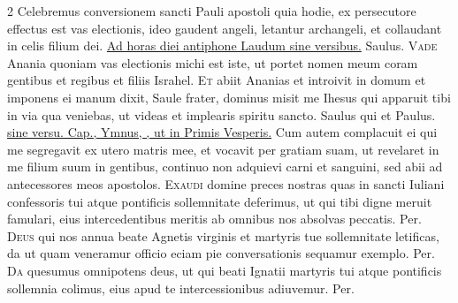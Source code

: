 \begin{multicols*}{2}
 Celebremus conversionem sancti Pauli apostoli quia hodie, ex persecutore effectus est vas electionis, ideo gaudent angeli, letantur archangeli, et collaudant in celis filium dei.
\newline \ul{Ad horas diei antiphone Laudum sine versibus.}
 Saulus.
\lettrine[lines=2]{\zallmancaps \color{Blue} V}{ade} Anania quoniam vas electionis michi est iste, ut portet nomen meum coram gentibus et regibus et filiis Israhel.
\lettrine[lines=2]{\zallmancaps \color{Red} E}{t} abiit Ananias et introivit in domum et imponens ei manum dixit, Saule frater, dominus misit me Ihesus qui apparuit tibi in via qua veniebas, ut videas et implearis spiritu sancto.
 Saulus qui et Paulus. \ul{sine versu. Cap., Ymnus, \Vbar , ut in Primis Vesperis.}
 Cum autem complacuit ei qui me segregavit ex utero matris mee, et vocavit per gratiam suam, ut revelaret in me filium suum in gentibus, continuo non adquievi carni et sanguini, sed abii ad antecessores meos apostolos.
{\color{Red} }
\lettrine[lines=2]{\zallmancaps \color{Blue} E}{xaudi} domine preces nostras quas in sancti Iuliani confessoris tui atque pontificis sollemnitate deferimus, ut qui tibi digne meruit famulari, eius intercedentibus meritis ab omnibus nos absolvas peccatis. Per.
{\color{Red} }
\lettrine[lines=2]{\zallmancaps \color{Red} D}{eus} qui nos annua beate Agnetis virginis et martyris tue sollemnitate letificas, da ut quam veneramur officio eciam pie conversationis sequamur exemplo. Per.
{\color{Red} }
\lettrine[lines=2]{\zallmancaps \color{Blue} D}{a} quesumus omnipotens deus, ut qui beati Ignatii martyris tui atque pontificis sollemnia colimus, eius apud te intercessionibus adiuvemur. Per.

\end{multicols*}
